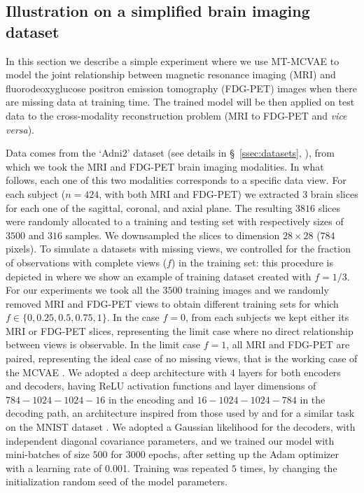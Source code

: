 \subsection{Illustration on a simplified brain imaging dataset}
\label{sec:proof_of_concept}

In this section we describe a simple experiment where we use MT-MCVAE to model the joint relationship between
magnetic resonance imaging (MRI) and fluorodeoxyglucose positron emission tomography (FDG-PET) images when there are missing data at training time.
The trained model will be then applied on test data
to the cross-modality reconstruction problem (MRI to FDG-PET and \textit{vice versa}).

Data comes from the `Adni2' dataset (see details in \S~\ref{ssec:datasets}, ), from which we took the MRI and FDG-PET brain imaging modalities.
In what follows, each one of this two modalities corresponds to a specific data view.
For each subject ($n=424$, with both MRI and FDG-PET) we extracted $3$ brain slices for each one of the sagittal, coronal, and axial plane.
The resulting $3816$ slices were randomly allocated to a training and testing set with respectively sizes of $3500$ and $316$ samples.
We downsampled the slices to dimension $28 \times 28$ ($784$ pixels).
%
To simulate a datasets with missing views, we controlled for the fraction of observations with complete views ($f$) in the training set:
this procedure is depicted in  where we show an example of training dataset created with $f=1/3$.
%
For our experiments we took all the $3500$ training images and we randomly removed MRI and FDG-PET views to obtain different training sets for which $f \in \{0, 0.25, 0.5, 0.75, 1\}$.
In the case $f = 0$, from each subjects we kept either its MRI or FDG-PET slices, representing the limit case where no direct relationship between views is observable.
In the limit case $f = 1$, all MRI and FDG-PET are paired, representing the ideal case of no missing views, that is the working case of the MCVAE \citep{Antelmi2019}.
We adopted a deep architecture with $4$ layers for both encoders and decoders, having ReLU activation functions and layer dimensions of $784-1024-1024-16$ in the encoding and $16-1024-1024-784$ in the decoding path,
an architecture inspired from those used by \cite{dcca1} and \cite{dcca2} for a similar task on the MNIST dataset \citep{mnist}.
We adopted a Gaussian likelihood for the decoders, with independent diagonal covariance parameters, and we trained our model with mini-batches of size $500$ for $3000$ epochs, after setting up the Adam optimizer with a learning rate of 0.001.
Training was repeated $5$ times, by changing the initialization random seed of the model parameters.

